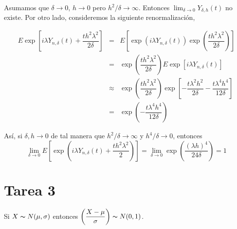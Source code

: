 \documentclass[
  letterpaper,
  DIV=11,
  numbers=noendperiod]{scrreprt}
\begin{document}
Asumamos que \(\delta\to0\), \(h\to0\) pero \(h^{2}/\delta\to\infty\).
Entonces \(\lim_{\delta\to0} Y_{\delta, h}(t)\) no existe. Por otro
lado, consideremos la siguiente renormalización,

\begin{eqnarray}
    E\exp\left[i\lambda Y_{n,\delta}\left(t\right)+\dfrac{th^{2}\lambda^{2}}{2\delta}\right] & = & E\left[\exp (i\lambda Y_{n,\delta}\left(t\right))\exp\left(\dfrac{th^{2}\lambda^{2}}{2\delta}\right)\right]\nonumber\\
    & = & \exp\left(\dfrac{th^{2}\lambda^{2}}{2\delta}\right)E\exp\left[ i\lambda Y_{n,\delta}\left(t\right)\right]\nonumber\\
    & \approx & \exp\left(\dfrac{th^{2}\lambda^{2}}{2\delta}\right)\exp\left[-\dfrac{t\lambda^{2} h^{2}}{2\delta}-\dfrac{t\lambda^{4} h^{4}}{12\delta}\right]\nonumber\\
    & = & \exp\left(-\dfrac{t\lambda^{4} h^{4}}{12\delta}\right)
\end{eqnarray}

Así, si \(\delta,h\to0\) de tal manera que \(h^{2}/\delta\to\infty\) y
\(h^{4}/\delta\to0\), entonces \[
\lim_{\delta\to0}E\left[\exp\left(i\lambda Y_{n,\delta}\left(t\right)+\dfrac{th^{2}\lambda^{2}}{2}\right)\right]=\lim_{\delta\to0}\exp\left(\dfrac{\left(\lambda h\right)^{4}}{24\delta}\right)=1
\]


\hypertarget{tarea-3}{%
\chapter{Tarea 3}\label{tarea-3}}

\newtheorem{demos}{Solución}

Si \(X\thicksim N(\mu,\sigma)\) entonces
\(\left(\dfrac{X-\mu}{\sigma}\right)\thicksim N(0,1)\).
\end{document}
